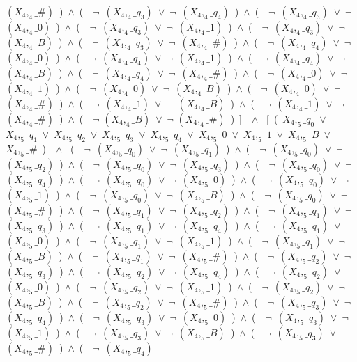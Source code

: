 ﻿\documentclass[a4paper,10pt]{article}
\begin{document}
$(X_4,_4\_\#)$\ )\ $\wedge$\ (\ \ $\neg$\ $(X_4,_4\_q_3)$\ $\vee$\ $\neg$\ $(X_4,_4\_q_4)$\ )\ $\wedge$\ (\ \ $\neg$\ $(X_4,_4\_q_3)$\ $\vee$\ $\neg$\ $(X_4,_4\_0)$\ )\ $\wedge$\ (\ \ $\neg$\ $(X_4,_4\_q_3)$\ $\vee$\ $\neg$\ $(X_4,_4\_1)$\ )\ $\wedge$\ (\ \ $\neg$\ $(X_4,_4\_q_3)$\ $\vee$\ $\neg$\ $(X_4,_4\_B)$\ )\ $\wedge$\ (\ \ $\neg$\ $(X_4,_4\_q_3)$\ $\vee$\ $\neg$\ $(X_4,_4\_\#)$\ )\ $\wedge$\ (\ \ $\neg$\ $(X_4,_4\_q_4)$\ $\vee$\ $\neg$\ $(X_4,_4\_0)$\ )\ $\wedge$\ (\ \ $\neg$\ $(X_4,_4\_q_4)$\ $\vee$\ $\neg$\ $(X_4,_4\_1)$\ )\ $\wedge$\ (\ \ $\neg$\ $(X_4,_4\_q_4)$\ $\vee$\ $\neg$\ $(X_4,_4\_B)$\ )\ $\wedge$\ (\ \ $\neg$\ $(X_4,_4\_q_4)$\ $\vee$\ $\neg$\ $(X_4,_4\_\#)$\ )\ $\wedge$\ (\ \ $\neg$\ $(X_4,_4\_0)$\ $\vee$\ $\neg$\ $(X_4,_4\_1)$\ )\ $\wedge$\ (\ \ $\neg$\ $(X_4,_4\_0)$\ $\vee$\ $\neg$\ $(X_4,_4\_B)$\ )\ $\wedge$\ (\ \ $\neg$\ $(X_4,_4\_0)$\ $\vee$\ $\neg$\ $(X_4,_4\_\#)$\ )\ $\wedge$\ (\ \ $\neg$\ $(X_4,_4\_1)$\ $\vee$\ $\neg$\ $(X_4,_4\_B)$\ )\ $\wedge$\ (\ \ $\neg$\ $(X_4,_4\_1)$\ $\vee$\ $\neg$\ $(X_4,_4\_\#)$\ )\ $\wedge$\ (\ \ $\neg$ $(X_4,_4\_B)$\ $\vee$\ $\neg$ $(X_4,_4\_\#)$\ )\ ]\ \ $\wedge$ \ [\ (\ $X_4,_5\_q_0$\ $\vee$\ $X_4,_5\_q_1$\ $\vee$\ $X_4,_5\_q_2$\ $\vee$\ $X_4,_5\_q_3$\ $\vee$\ $X_4,_5\_q_4$\ $\vee$\ $X_4,_5\_0$\ $\vee$\ $X_4,_5\_1$\ $\vee$\ $X_4,_5\_B$\ $\vee$\ $X_4,_5\_\#$\ )\ \ $\wedge$ \ (\ \ $\neg$\ $(X_4,_5\_q_0)$\ $\vee$\ $\neg$\ $(X_4,_5\_q_1)$\ )\ $\wedge$\ (\ \ $\neg$\ $(X_4,_5\_q_0)$\ $\vee$\ $\neg$\ $(X_4,_5\_q_2)$\ )\ $\wedge$\ (\ \ $\neg$\ $(X_4,_5\_q_0)$\ $\vee$\ $\neg$\ $(X_4,_5\_q_3)$\ )\ $\wedge$\ (\ \ $\neg$\ $(X_4,_5\_q_0)$\ $\vee$\ $\neg$\ $(X_4,_5\_q_4)$\ )\ $\wedge$\ (\ \ $\neg$\ $(X_4,_5\_q_0)$\ $\vee$\ $\neg$\ $(X_4,_5\_0)$\ )\ $\wedge$\ (\ \ $\neg$\ $(X_4,_5\_q_0)$\ $\vee$\ $\neg$\ $(X_4,_5\_1)$\ )\ $\wedge$\ (\ \ $\neg$\ $(X_4,_5\_q_0)$\ $\vee$\ $\neg$\ $(X_4,_5\_B)$\ )\ $\wedge$\ (\ \ $\neg$\ $(X_4,_5\_q_0)$\ $\vee$\ $\neg$\ $(X_4,_5\_\#)$\ )\ $\wedge$\ (\ \ $\neg$\ $(X_4,_5\_q_1)$\ $\vee$\ $\neg$\ $(X_4,_5\_q_2)$\ )\ $\wedge$\ (\ \ $\neg$\ $(X_4,_5\_q_1)$\ $\vee$\ $\neg$\ $(X_4,_5\_q_3)$\ )\ $\wedge$\ (\ \ $\neg$\ $(X_4,_5\_q_1)$\ $\vee$\ $\neg$\ $(X_4,_5\_q_4)$\ )\ $\wedge$\ (\ \ $\neg$\ $(X_4,_5\_q_1)$\ $\vee$\ $\neg$\ $(X_4,_5\_0)$\ )\ $\wedge$\ (\ \ $\neg$\ $(X_4,_5\_q_1)$\ $\vee$\ $\neg$\ $(X_4,_5\_1)$\ )\ $\wedge$\ (\ \ $\neg$\ $(X_4,_5\_q_1)$\ $\vee$\ $\neg$\ $(X_4,_5\_B)$\ )\ $\wedge$\ (\ \ $\neg$\ $(X_4,_5\_q_1)$\ $\vee$\ $\neg$\ $(X_4,_5\_\#)$\ )\ $\wedge$\ (\ \ $\neg$\ $(X_4,_5\_q_2)$\ $\vee$\ $\neg$\ $(X_4,_5\_q_3)$\ )\ $\wedge$\ (\ \ $\neg$\ $(X_4,_5\_q_2)$\ $\vee$\ $\neg$\ $(X_4,_5\_q_4)$\ )\ $\wedge$\ (\ \ $\neg$\ $(X_4,_5\_q_2)$\ $\vee$\ $\neg$\ $(X_4,_5\_0)$\ )\ $\wedge$\ (\ \ $\neg$\ $(X_4,_5\_q_2)$\ $\vee$\ $\neg$\ $(X_4,_5\_1)$\ )\ $\wedge$\ (\ \ $\neg$\ $(X_4,_5\_q_2)$\ $\vee$\ $\neg$\ $(X_4,_5\_B)$\ )\ $\wedge$\ (\ \ $\neg$\ $(X_4,_5\_q_2)$\ $\vee$\ $\neg$\ $(X_4,_5\_\#)$\ )\ $\wedge$\ (\ \ $\neg$\ $(X_4,_5\_q_3)$\ $\vee$\ $\neg$\ $(X_4,_5\_q_4)$\ )\ $\wedge$\ (\ \ $\neg$\ $(X_4,_5\_q_3)$\ $\vee$\ $\neg$\ $(X_4,_5\_0)$\ )\ $\wedge$\ (\ \ $\neg$\ $(X_4,_5\_q_3)$\ $\vee$\ $\neg$\ $(X_4,_5\_1)$\ )\ $\wedge$\ (\ \ $\neg$\ $(X_4,_5\_q_3)$\ $\vee$\ $\neg$\ $(X_4,_5\_B)$\ )\ $\wedge$\ (\ \ $\neg$\ $(X_4,_5\_q_3)$\ $\vee$\ $\neg$\ $(X_4,_5\_\#)$\ )\ $\wedge$\ (\ \ $\neg$\ $(X_4,_5\_q_4)$\ 
\end{document}
